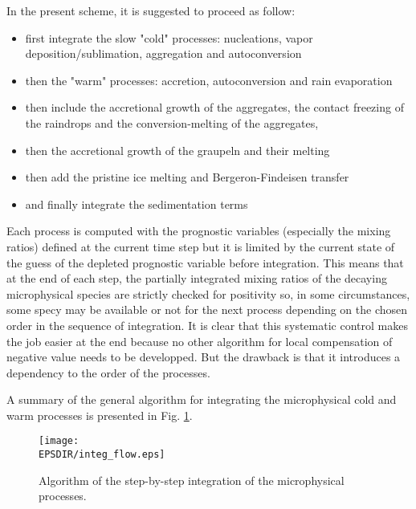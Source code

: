 In the present scheme, it is suggested to proceed as follow:

\begin{itemize}
\item first integrate the slow "cold" processes: nucleations, vapor
deposition/sublimation, aggregation and autoconversion
\item then the "warm" processes: accretion, autoconversion and
rain evaporation
\item then include the accretional growth of the aggregates, the contact
freezing of the raindrops and the conversion-melting of the aggregates,
\item then the accretional growth of the graupeln and their melting
\item then add the pristine ice melting and Bergeron-Findeisen transfer
\item and finally integrate the sedimentation terms
\end{itemize}

\noindent Each process is computed with the prognostic variables (especially
the mixing ratios) defined at the current time step but it is limited by
the current state of the guess of the depleted prognostic variable before
integration. This means that at the end of each step, the partially integrated
mixing ratios of the decaying microphysical species are strictly checked for
positivity so, in some circumstances, some specy may be available or not for
the next process depending on the chosen order in the sequence of integration.
It is clear that this systematic control makes the job easier at the end
because no other algorithm for local compensation of negative value needs to
be developped. But the drawback is that it introduces a dependency to the order of the processes.

A summary of the general algorithm for integrating the microphysical cold and
warm processes is presented in Fig. \ref{mixfigalgo}.

\begin{figure}[!ht]
\centerline{\texttt{[image: \\EPSDIR/integ\_flow.eps]}}
\caption{Algorithm of the step-by-step integration of the microphysical processes.}
\label{mixfigalgo}
\end{figure}

%
